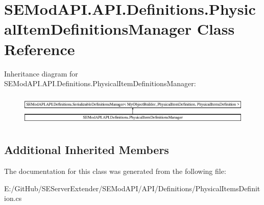 \hypertarget{class_s_e_mod_a_p_i_1_1_a_p_i_1_1_definitions_1_1_physical_item_definitions_manager}{}\section{S\+E\+Mod\+A\+P\+I.\+A\+P\+I.\+Definitions.\+Physical\+Item\+Definitions\+Manager Class Reference}
\label{class_s_e_mod_a_p_i_1_1_a_p_i_1_1_definitions_1_1_physical_item_definitions_manager}
Inheritance diagram for S\+E\+Mod\+A\+P\+I.\+A\+P\+I.\+Definitions.\+Physical\+Item\+Definitions\+Manager\+:\begin{figure}[H]
\begin{center}
\leavevmode
\includegraphics[height=1.523810cm]{class_s_e_mod_a_p_i_1_1_a_p_i_1_1_definitions_1_1_physical_item_definitions_manager}
\end{center}
\end{figure}
\subsection*{Additional Inherited Members}


The documentation for this class was generated from the following file\+:\begin{DoxyCompactItemize}
\item 
E\+:/\+Git\+Hub/\+S\+E\+Server\+Extender/\+S\+E\+Mod\+A\+P\+I/\+A\+P\+I/\+Definitions/Physical\+Items\+Definition.\+cs\end{DoxyCompactItemize}
